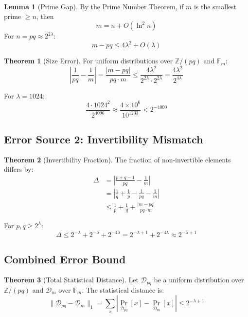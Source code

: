\documentclass[11pt]{article}
\theoremstyle{definition}
\newtheorem{theorem}{Theorem}
\newtheorem{lemma}{Lemma}
\begin{document}
\begin{lemma}[Prime Gap]
By the Prime Number Theorem, if $m$ is the smallest prime $\geq n$, then
\[
m = n + O(\ln^2 n)
\]
For $n = pq \approx 2^{2\lambda}$:
\[
m - pq \leq 4\lambda^2 + O(\lambda)
\]
\end{lemma}

\begin{theorem}[Size Error]
For uniform distributions over $\mathbb{Z}/(pq)$ and $\mathbb{F}_m$:
\[
\left| \frac{1}{pq} - \frac{1}{m} \right| = \frac{|m-pq|}{pq \cdot m} 
\leq \frac{4\lambda^2}{2^{2\lambda} \cdot 2^{2\lambda}} = \frac{4\lambda^2}{2^{4\lambda}}
\]

For $\lambda = 1024$:
\[
\frac{4 \cdot 1024^2}{2^{4096}} \approx \frac{4 \times 10^6}{10^{1233}} < 2^{-4000}
\]
\end{theorem}

\subsection{Error Source 2: Invertibility Mismatch}

\begin{theorem}[Invertibility Fraction]
The fraction of non-invertible elements differs by:
\begin{align*}
\Delta &= \left| \frac{p+q-1}{pq} - \frac{1}{m} \right| \\
&= \left| \frac{1}{q} + \frac{1}{p} - \frac{1}{pq} - \frac{1}{m} \right| \\
&\leq \frac{1}{p} + \frac{1}{q} + \frac{|m-pq|}{pq \cdot m}
\end{align*}

For $p,q \geq 2^\lambda$:
\[
\Delta \leq 2^{-\lambda} + 2^{-\lambda} + 2^{-4\lambda} = 2^{-\lambda+1} + 2^{-4\lambda} 
\approx 2^{-\lambda+1}
\]
\end{theorem}

\subsection{Combined Error Bound}

\begin{theorem}[Total Statistical Distance]
Let $\mathcal{D}_{pq}$ be a uniform distribution over $\mathbb{Z}/(pq)$ and 
$\mathcal{D}_m$ over $\mathbb{F}_m$. The statistical distance is:
\[
\|\mathcal{D}_{pq} - \mathcal{D}_m\|_1 
= \sum_{x} |\Pr_{\mathcal{D}_{pq}}[x] - \Pr_{\mathcal{D}_m}[x]|
\leq 2^{-\lambda+1}
\]
\end{theorem}
\end{document}
